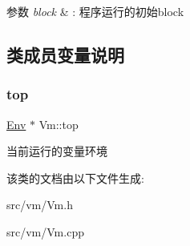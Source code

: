 \begin{DoxyParams}{参数}
{\em block} & \+: 程序运行的初始block \\
\hline
\end{DoxyParams}


\subsection{类成员变量说明}
\mbox{\label{class_vm_a1a83823801a5ab090d9ad20527a6c638}} 
\subsubsection{\texorpdfstring{top}{top}}
{\footnotesize\ttfamily \hyperlink{class_env}{Env} $\ast$ Vm\+::top\hspace{0.3cm}{\ttfamily [static]}}

当前运行的变量环境 

该类的文档由以下文件生成\+:\begin{DoxyCompactItemize}
\item 
src/vm/Vm.\+h\item 
src/vm/Vm.\+cpp\end{DoxyCompactItemize}
